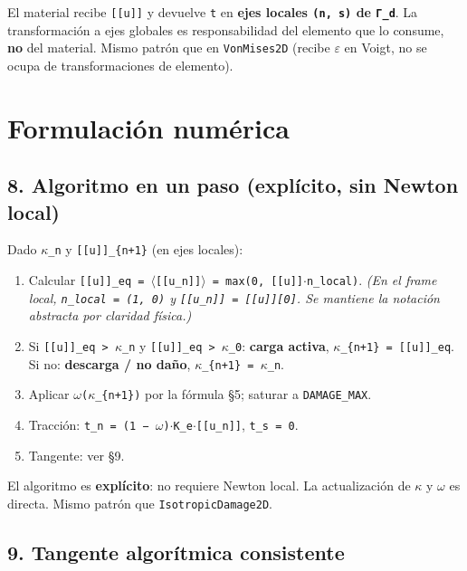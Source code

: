 \documentclass[11pt,letterpaper,oneside]{report}
\begin{document}
El material recibe \texttt{[[u]]} y devuelve \texttt{t} en \textbf{ejes locales \texttt{(n, s)} de \texttt{Γ\_d}}. La transformación a ejes globales es responsabilidad del elemento que lo consume, \textbf{no} del material. Mismo patrón que en \texttt{VonMises2D} (recibe \texttt{\ensuremath{\varepsilon}} en Voigt, no se ocupa de transformaciones de elemento).


\section{Formulación numérica}

\subsection{8. Algoritmo en un paso (explícito, sin Newton local)}

Dado \texttt{\ensuremath{\kappa}\_n} y \texttt{[[u]]\_\{n+1\}} (en ejes locales):

\begin{enumerate}
  \item Calcular \texttt{[[u]]\_eq = \ensuremath{\langle}[[u\_n]]\ensuremath{\rangle} = max(0, [[u]]\ensuremath{\cdot}n\_local)}. \textit{(En el frame local, \texttt{n\_local = (1, 0)} y \texttt{[[u\_n]] = [[u]][0]}. Se mantiene la notación abstracta por claridad física.)}
  \item Si \texttt{[[u]]\_eq > \ensuremath{\kappa}\_n} y \texttt{[[u]]\_eq > \ensuremath{\kappa}\_0}: \textbf{carga activa}, \texttt{\ensuremath{\kappa}\_\{n+1\} = [[u]]\_eq}. Si no: \textbf{descarga / no daño}, \texttt{\ensuremath{\kappa}\_\{n+1\} = \ensuremath{\kappa}\_n}.
  \item Aplicar \texttt{\ensuremath{\omega}(\ensuremath{\kappa}\_\{n+1\})} por la fórmula §5; saturar a \texttt{DAMAGE\_MAX}.
  \item Tracción: \texttt{t\_n = (1 − \ensuremath{\omega})\ensuremath{\cdot}K\_e\ensuremath{\cdot}[[u\_n]]}, \texttt{t\_s = 0}.
  \item Tangente: ver §9.
\end{enumerate}

El algoritmo es \textbf{explícito}: no requiere Newton local. La actualización de \texttt{\ensuremath{\kappa}} y \texttt{\ensuremath{\omega}} es directa. Mismo patrón que \texttt{IsotropicDamage2D}.

\subsection{9. Tangente algorítmica consistente}
\end{document}
